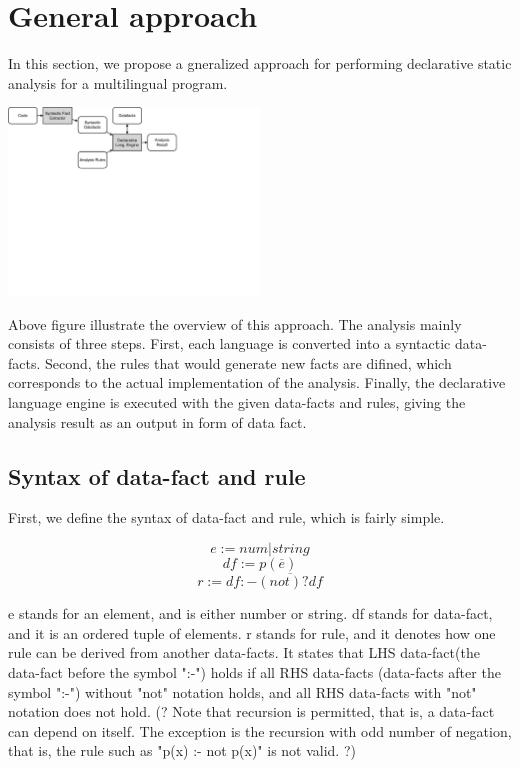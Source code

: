 \section{General approach}

In this section, we propose a gneralized approach for performing declarative
static analysis for a multilingual program.

\includegraphics[width=0.5\textwidth]{img/overview}

Above figure illustrate the overview of this approach. The analysis mainly
consists of three steps. First, each language is converted into a syntactic
data-facts. Second, the rules that would generate new facts are difined, which
corresponds to the actual implementation of the analysis. Finally, the
declarative language engine is executed with the given data-facts and rules,
giving the analysis result as an output in form of data fact.

\subsection{Syntax of data-fact and rule}

First, we define the syntax of data-fact and rule, which is fairly simple.

\[e := num | string\]
\[df := p(\overline{e})\]
\[r := df :- \overline{(not)? df}\]

e stands for an element, and is either number or string.  df stands for
data-fact, and it is an ordered tuple of elements.  r stands for rule, and it
denotes how one rule can be derived from another data-facts.  It states that
LHS data-fact(the data-fact before the symbol ":-") holds if all RHS data-facts
(data-facts after the symbol ":-") without "not" notation holds, and all RHS
data-facts with "not" notation does not hold.  (? Note that recursion is
permitted, that is, a data-fact can depend on itself.  The exception is the
recursion with odd number of negation, that is, the rule such as "p(x) :- not
p(x)" is not valid. ?)

